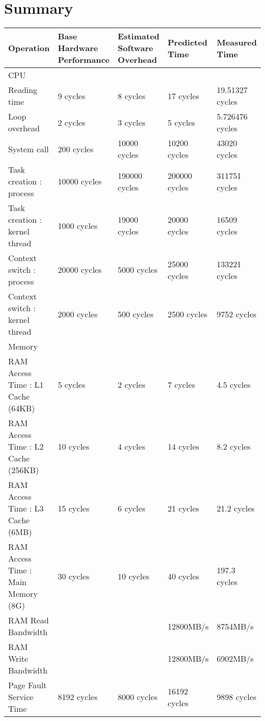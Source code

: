 \chapter{Summary}

\small
\begin{center}
\begin{tabular}{| p{4cm} | p{2.5cm} | p{2.5cm} | p{2.5cm} | p{2.5cm} |}
\hline
Operation  & Base Hardware Performance  & Estimated Software Overhead  & Predicted Time  & Measured Time   \\
\hline 
CPU & & & & \\
\hline
Reading time & 9 cycles & 8 cycles & 17 cycles & 19.51327 cycles \\
Loop overhead & 2 cycles& 3 cycles& 5 cycles& 5.726476 cycles\\
System call & 200 cycles& 10000 cycles& 10200 cycles& 43020 cycles \\
Task creation : process & 10000 cycles& 190000 cycles& 200000 cycles& 311751 cycles \\
Task creation : kernel thread    & 1000 cycles& 19000 cycles& 20000 cycles& 16509 cycles\\
Context switch : process & 20000 cycles& 5000 cycles& 25000 cycles& 133221  cycles\\
Context switch : kernel thread    & 2000 cycles& 500 cycles& 2500 cycles& 9752 cycles\\
\hline 
Memory & & & & \\
\hline
RAM Access Time : L1 Cache (64KB) &   5 cycles  & 2 cycles & 7 cycles &  4.5 cycles \\
RAM Access Time : L2 Cache (256KB) & 10 cycles & 4 cycles & 14 cycles &  8.2 cycles\\
RAM Access Time : L3 Cache (6MB) & 15 cycles & 6 cycles & 21 cycles  & 21.2 cycles\\
RAM Access Time : Main Memory (8G) & 30 cycles & 10 cycles & 40 cycles & 197.3 cycles\\
RAM Read Bandwidth & & & 12800MB/s & 8754MB/s \\
RAM Write Bandwidth & & & 12800MB/s & 6902MB/s \\
Page Fault Service Time & 8192 cycles& 8000 cycles& 16192 cycles& 9898 cycles\\
\end{tabular}
\end{center}



